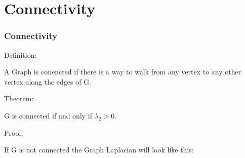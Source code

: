 \documentclass{beamer}
\begin{document}

\section{Connectivity}
\begin{frame}
\frametitle{\textbf{Connectivity} }
Definition: \vspace{0.2 cm}

A Graph is conencted if there is a way to walk from any vertex to any other vertex along the edges of G.


Theorem:

G is connected if and only if $\lambda_2 > 0$.

Proof:

If G is not connected the Graph Laplacian will look like this:


\end{frame}

\end{document}
